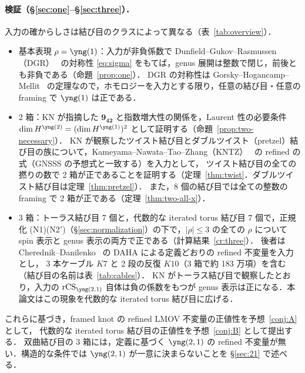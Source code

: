 \paragraph{検証（\S\ref{sec:one}--\S\ref{sec:three}）．}
入力の確からしさは結び目のクラスによって異なる（表~\ref{tab:overview}）．
\begin{itemize}
\item 基本表現 $\rho=\yng(1)$：入力が非負係数で Dunfield--Gukov--Rasmussen（DGR）~\cite{Dunfield05} の対称性 \eqref{eq:sigma} をもてば，genus 展開は整数で閉じ，前後とも非負である（命題~\ref{prop:one}）．
DGR の対称性は Gorsky--Hogancamp--Mellit~\cite{Gorsky21} の定理なので，ホモロジーを入力とする限り，任意の結び目・任意の framing で $\yng(1)$ は正である．
\item 2 箱：KN が指摘した $\mathbf{9_{42}}$ と指数増大性の関係を，Laurent 性の必要条件 $\dim H^{\yng(2)}=(\dim H^{\yng(1)})^2$ として証明する（命題~\ref{prop:two-necessary}）．
KN が観察したツイスト結び目とダブルツイスト（pretzel）結び目の族について，Kameyama--Nawata--Tao--Zhang（KNTZ）~\cite{Kameyama19} の refined の式（GNSSS の予想式と一致する）を入力として，
ツイスト結び目の全ての撚りの数で 2 箱が正であることを証明する（定理~\ref{thm:twist}．ダブルツイスト結び目は定理~\ref{thm:pretzel}）．
また，8 個の結び目では全ての整数の framing で 2 箱が正である（定理~\ref{thm:two-all-x}）．
\item 3 箱：トーラス結び目 7 個と，代数的な iterated torus 結び目 7 個で，正規化 (N1)(N2$'$)（\S\ref{sec:normalization}）の下で，$|\rho|\le3$ の全ての $\rho$ について spin 表示と genus 表示の両方で正である（計算結果~\ref{cr:three}）．
後者は Cherednik--Danilenko~\cite{Cherednik14} の DAHA による定義どおりの refined 不変量を入力とし，
3 本ケーブル $K7$ と 2 段の反復 $K10$（3 箱で約 183 万項）を含む（結び目の名前は表~\ref{tab:cables}）．
KN がトーラス結び目で観察したとおり，入力の $\rCS_{\yng(2,1)}$ 自体は負の係数をもつが genus 表示は正になる．本論文はこの現象を代数的な iterated torus 結び目に広げる．
\end{itemize}
これらに基づき，framed knot の refined LMOV 不変量の正値性を予想~\ref{conj:A} として，
代数的な iterated torus 結び目の正値性を予想~\ref{conj:B} として提出する．
双曲結び目の 3 箱には，定義に基づく $\yng(2,1)$ の refined 不変量が無い．構造的な条件では $\yng(2,1)$ が一意に決まらないことを \S\ref{sec:21} で述べる．

